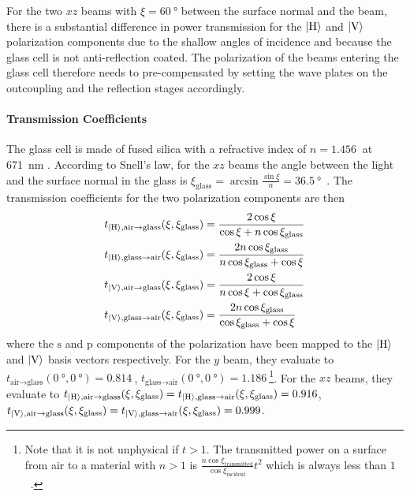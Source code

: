 For the two $xz$ beams with $\xi = \SI{60}{\degree}$ between the surface normal and the beam, there is a substantial difference in power transmission for the $\Ket{\text{H}}$ and $\Ket{\text{V}}$ polarization components due to the shallow angles of incidence and because the glass cell is not anti-reflection coated. The polarization of the beams entering the glass cell therefore needs to pre-compensated by setting the wave plates on the outcoupling and the reflection stages accordingly.

\paragraph{Transmission Coefficients} The glass cell is made of fused silica with a refractive index of $n = \SI{1.456}{}$ at \SI{671}{\nano\meter} \cite{malitson_interspecimen_1965}. According to Snell's law, for the $xz$ beams the angle between the light and the surface normal in the glass is $\xi_\text{glass} = \arcsin \frac{\sin \xi}{n} = \SI{36.5}{\degree}$~\cite{demtroder_elektromagnetische_2013}. The transmission coefficients for the two polarization components are then~\cite{demtroder_elektromagnetische_2013}
\begin{align}\label{eq:fresnel}
    \begin{split}
        t_{\Ket{\text{H}}, \text{air} \rightarrow \text{glass}}(\xi, \xi_\text{glass})  &= \frac{2 \cos \xi}{\cos \xi + n \cos \xi_\text{glass}}\\
        t_{\Ket{\text{H}}, \text{glass} \rightarrow \text{air}}(\xi, \xi_\text{glass})  &= \frac{2n \cos \xi_\text{glass}}{n \cos \xi_\text{glass} + \cos \xi} \\
        t_{\Ket{\text{V}}, \text{air} \rightarrow \text{glass}}(\xi, \xi_\text{glass})  &= \frac{2 \cos \xi}{n \cos \xi + \cos \xi_\text{glass}}\\ 
        t_{\Ket{\text{V}}, \text{glass} \rightarrow \text{air}}(\xi, \xi_\text{glass})  &= \frac{2 n \cos \xi_\text{glass}}{\cos \xi_\text{glass} + \cos \xi}\\ 
    \end{split}
\end{align}
where the $\text{s}$ and $\text{p}$ components of the polarization have been mapped to the $\Ket{\text{H}}$ and $\Ket{\text{V}}$ basis vectors respectively. For the $y$ beam, they evaluate to $t_{\text{air} \rightarrow \text{glass}}(\SI{0}{\degree}, \SI{0}{\degree}) = \SI{0.814}{}$, $t_{\text{glass} \rightarrow \text{air}}(\SI{0}{\degree}, \SI{0}{\degree}) = \SI{1.186}{}$\footnote{Note that it is not unphysical if $t > 1$. The transmitted power on a surface from air to a material with $n > 1$ is $\frac{n \cos \xi_\text{transmitted}}{\cos \xi_\text{incident}}t^2$ which is always less than $1$~\cite{demtroder_elektromagnetische_2013}.}. For the $xz$ beams, they evaluate to $t_{\Ket{\text{H}}, \text{air} \rightarrow \text{glass}}(\xi, \xi_\text{glass}) = t_{\Ket{\text{H}}, \text{glass} \rightarrow \text{air}}(\xi, \xi_\text{glass}) = \SI{0.916}{}$, $t_{\Ket{\text{V}}, \text{air} \rightarrow \text{glass}}(\xi, \xi_\text{glass}) = t_{\Ket{\text{V}}, \text{glass} \rightarrow \text{air}}(\xi, \xi_\text{glass}) = \SI{0.999}{}$.

